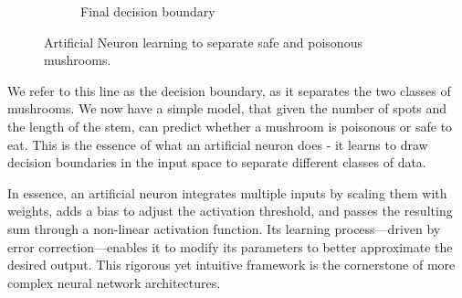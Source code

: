 \documentclass[9pt]{extarticle}
\theoremstyle{plain}
\theoremstyle{definition}
\theoremstyle{remark}
\begin{document}
\begin{figure}[h]
\begin{subfigure}{0.3\textwidth}
        \caption{Final decision boundary}
    \end{subfigure}
    \caption{Artificial Neuron learning to separate safe and poisonous mushrooms.}
\end{figure}
We refer to this line as the decision boundary, as it separates the two classes of mushrooms. We now have a simple model, that given the number of spots and the length of the stem, can predict whether a mushroom is poisonous or safe to eat. This is the essence of what an artificial neuron does - it learns to draw decision boundaries in the input space to separate different classes of data.

In essence, an artificial neuron integrates multiple inputs by scaling them with weights, adds a bias to adjust the activation threshold, and passes the resulting sum through a non-linear activation function. Its learning process—driven by error correction—enables it to modify its parameters to better approximate the desired output. This rigorous yet intuitive framework is the cornerstone of more complex neural network architectures.
\end{document}
